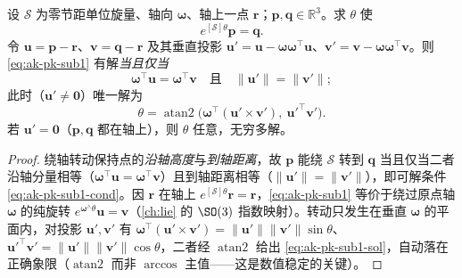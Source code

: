 \begin{theorem}\label{thm:ak-pk-sub1}
设 $\mathcal{S}$ 为零节距单位旋量、轴向 $\boldsymbol{\omega}$、轴上一点 $\mathbf{r}$；$\mathbf{p},\mathbf{q}\in\mathbb{R}^3$。求 $\theta$ 使\cite{murray1994mathematical}
\begin{equation}
e^{[\mathcal{S}]\theta}\mathbf{p}=\mathbf{q}.
\label{eq:ak-pk-sub1}
\end{equation}
令 $\mathbf{u}=\mathbf{p}-\mathbf{r}$、$\mathbf{v}=\mathbf{q}-\mathbf{r}$ 及其垂直投影 $\mathbf{u}'=\mathbf{u}-\boldsymbol{\omega}\boldsymbol{\omega}^\top\mathbf{u}$、$\mathbf{v}'=\mathbf{v}-\boldsymbol{\omega}\boldsymbol{\omega}^\top\mathbf{v}$。则 \cref{eq:ak-pk-sub1} 有解\emph{当且仅当}
\begin{equation}
\boldsymbol{\omega}^\top\mathbf{u}=\boldsymbol{\omega}^\top\mathbf{v}\quad\text{且}\quad\|\mathbf{u}'\|=\|\mathbf{v}'\|;
\label{eq:ak-pk-sub1-cond}
\end{equation}
此时（$\mathbf{u}'\neq\mathbf{0}$）唯一解为
\begin{equation}
\theta=\operatorname{atan2}\!\big(\boldsymbol{\omega}^\top(\mathbf{u}'\times\mathbf{v}'),\ \mathbf{u}'^\top\mathbf{v}'\big).
\label{eq:ak-pk-sub1-sol}
\end{equation}
若 $\mathbf{u}'=\mathbf{0}$（$\mathbf{p},\mathbf{q}$ 都在轴上），则 $\theta$ 任意，无穷多解。
\end{theorem}
\begin{proof}
绕轴转动保持点的\emph{沿轴高度}与\emph{到轴距离}，故 $\mathbf{p}$ 能绕 $\mathcal{S}$ 转到 $\mathbf{q}$ 当且仅当二者沿轴分量相等（$\boldsymbol{\omega}^\top\mathbf{u}=\boldsymbol{\omega}^\top\mathbf{v}$）且到轴距离相等（$\|\mathbf{u}'\|=\|\mathbf{v}'\|$），即可解条件 \cref{eq:ak-pk-sub1-cond}。因 $\mathbf{r}$ 在轴上 $e^{[\mathcal{S}]\theta}\mathbf{r}=\mathbf{r}$，\cref{eq:ak-pk-sub1} 等价于绕过原点轴 $\boldsymbol{\omega}$ 的纯旋转 $e^{\boldsymbol{\omega}^\wedge\theta}\mathbf{u}=\mathbf{v}$（\cref{ch:lie} 的 $\SO(3)$ 指数映射）。转动只发生在垂直 $\boldsymbol{\omega}$ 的平面内，对投影 $\mathbf{u}',\mathbf{v}'$ 有 $\boldsymbol{\omega}^\top(\mathbf{u}'\times\mathbf{v}')=\|\mathbf{u}'\|\|\mathbf{v}'\|\sin\theta$、$\mathbf{u}'^\top\mathbf{v}'=\|\mathbf{u}'\|\|\mathbf{v}'\|\cos\theta$，二者经 $\operatorname{atan2}$ 给出 \cref{eq:ak-pk-sub1-sol}，自动落在正确象限（$\operatorname{atan2}$ 而非 $\arccos$ 主值——这是数值稳定的关键）。
\end{proof}

